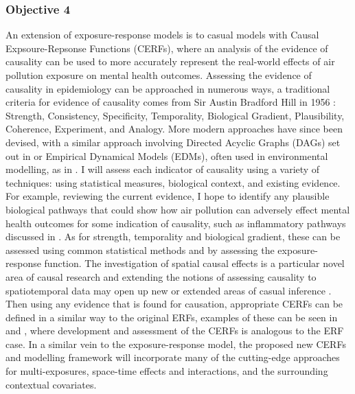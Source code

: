\subsubsection{Objective 4}
An extension of exposure-response models is to casual models with Causal Expsoure-Repsonse Functions (CERFs), where an analysis of the evidence of causality can be used to more accurately represent the real-world effects of air pollution exposure on mental health outcomes. Assessing the evidence of causality in epidemiology can be approached in numerous ways, a traditional criteria for evidence of causality comes from Sir Austin Bradford Hill in 1956 \citep{Hill1965TheCausation}: Strength, Consistency, Specificity, Temporality, Biological Gradient, Plausibility, Coherence, Experiment, and Analogy. More modern approaches have since been devised, with a similar approach involving Directed Acyclic Graphs (DAGs) set out in \cite{Shimonovich2021AssessingThinking} or Empirical Dynamical Models (EDMs), often used in environmental modelling, as in \cite{Wu2020EmpiricalChina}. I will assess each indicator of causality using a variety of techniques: using statistical measures, biological context, and existing evidence. For example, reviewing the current evidence, I hope to identify any plausible biological pathways that could show how air pollution can adversely effect mental health outcomes for some indication of causality, such as inflammatory pathways discussed in \cite{Bakolis2021MentalSurvey}. As for strength, temporality and biological gradient, these can be assessed using common statistical methods and by assessing the exposure-response function. The investigation of spatial causal effects is a particular novel area of causal research and extending the notions of assessing causality to spatiotemporal data may open up new or extended areas of casual inference \citep{Akbari2021SpatialInference}. Then using any evidence that is found for causation, appropriate CERFs can be defined in a similar way to the original ERFs, examples of these can be seen in \cite{Ren2021BayesianOutcomes} and \cite{Papadogeorgou2020AMatter}, where development and assessment of the CERFs is analogous to the ERF case. In a similar vein to the exposure-response model, the proposed new CERFs and modelling framework will incorporate many of the cutting-edge approaches for multi-exposures, space-time effects and interactions, and the surrounding contextual covariates. 

